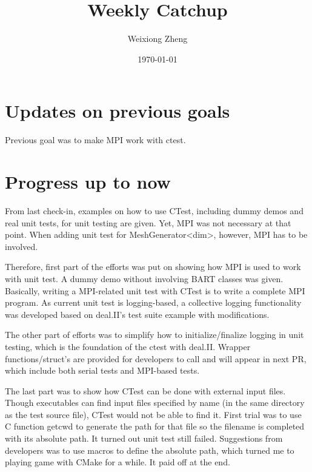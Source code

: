 \documentclass{article}
\title{Weekly Catchup} %
\author{Weixiong Zheng} %
\date{\today} %
\begin{document}
\maketitle %

\section{Updates on previous goals}
Previous goal was to make MPI work with ctest.
\section{Progress up to now}
From last check-in, examples on how to use CTest, including dummy demos and real unit 
tests, for unit testing are given. Yet, MPI was not necessary at that point. When adding unit 
test for MeshGenerator<dim>, however, MPI has to be involved.

Therefore, first part of the efforts was put on showing how MPI is used to work with unit 
test. A dummy demo without involving BART classes was given. Basically, writing a 
MPI-related unit test with CTest is to write a complete MPI program. As current unit test
is logging-based, a collective logging functionality was developed based on deal.II's test suite example with modifications.

The other part of efforts was to simplify how to initialize/finalize logging in unit testing, 
which is the foundation of the ctest with deal.II. Wrapper functions/struct's are provided for 
developers to call and will appear in next PR, which include both serial tests and MPI-based tests.

The last part was to show how CTest can be done with external input files. Though executables
can find input files specified by name (in the same directory as the test source file), CTest
would not be able to find it. First trial was to use C function getcwd to generate the path for that file so the filename is completed with its absolute path. It turned out unit test still failed. 
Suggestions from developers was to use macros to define the absolute path, which turned me 
to playing game with CMake for a while. It paid off at the end.
\end{document}
